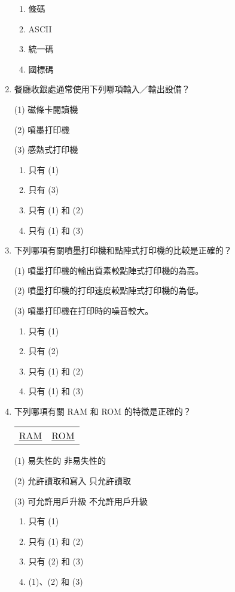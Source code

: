 \documentclass[12pt,a4paper]{article}
\begin{document}
\begin{enumerate}
\begin{enumerate}[label=\Alph*.]
\item 條碼
\item ASCII
\item 統一碼
\item 國標碼
\end{enumerate}

\item 餐廳收銀處通常使用下列哪項輸入／輸出設備？

(1) 磁條卡閱讀機

(2) 噴墨打印機

(3) 感熱式打印機

\begin{enumerate}[label=\Alph*.]
\item 只有 (1)
\item 只有 (3)
\item 只有 (1) 和 (2)
\item 只有 (1) 和 (3)
\end{enumerate}

\item 下列哪項有關噴墨打印機和點陣式打印機的比較是正確的？

(1) 噴墨打印機的輸出質素較點陣式打印機的為高。

(2) 噴墨打印機的打印速度較點陣式打印機的為低。

(3) 噴墨打印機在打印時的噪音較大。

\begin{enumerate}[label=\Alph*.]
\item 只有 (1)
\item 只有 (2)
\item 只有 (1) 和 (2)
\item 只有 (1) 和 (3)
\end{enumerate}

\item 下列哪項有關 RAM 和 ROM 的特徵是正確的？

\begin{center}
\begin{tabular}{cc}
\underline{RAM} & \underline{ROM} \\
\end{tabular}
\end{center}

(1) 易失性的 \quad 非易失性的

(2) 允許讀取和寫入 \quad 只允許讀取

(3) 可允許用戶升級 \quad 不允許用戶升級

\begin{enumerate}[label=\Alph*.]
\item 只有 (1)
\item 只有 (1) 和 (2)
\item 只有 (2) 和 (3)
\item (1)、(2) 和 (3)
\end{enumerate}


\end{enumerate}
\end{document}
